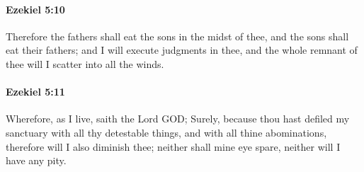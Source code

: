 		\paragraph{Ezekiel 5:10} %
			\label{EZEKIEL-5-10}

			Therefore the fathers shall eat the sons in the midst of thee, and the sons shall eat their fathers; and I will execute judgments in thee, and the whole remnant of thee will I scatter into all the winds.


		\paragraph{Ezekiel 5:11} %
			\label{EZEKIEL-5-11}

			Wherefore, as I live, saith the Lord GOD; Surely, because thou hast defiled my sanctuary with all thy detestable things, and with all thine abominations, therefore will I also diminish thee; neither shall mine eye spare, neither will I have any pity.

